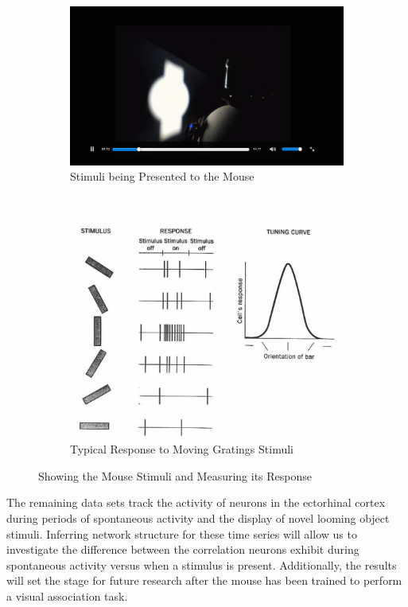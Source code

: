 \documentclass{article}
\begin{document}
\begin{figure}[ht]
  \centering

  \begin{subfigure}{0.45\textwidth}
    \includegraphics[width=\textwidth]{looming}
    \caption{Stimuli being Presented to the Mouse}
    \label{fig:setup}
  \end{subfigure}
  ~
  \begin{subfigure}{0.45\textwidth}
    \includegraphics[width=\textwidth]{moving_gratings}
    \caption{Typical Response to Moving Gratings Stimuli}
    \label{fig:tuning}
  \end{subfigure}

  \caption{Showing the Mouse Stimuli and Measuring its Response}
\end{figure}

The remaining data sets track the activity of neurons in the ectorhinal cortex 
during periods of spontaneous activity and the display of novel looming object stimuli. 
Inferring network structure for these time series will allow us to investigate 
the difference between the correlation neurons exhibit during spontaneous 
activity versus when a stimulus is present. Additionally, the results will set the stage for future research after the mouse has been trained to perform a visual association task. \par
\end{document}
